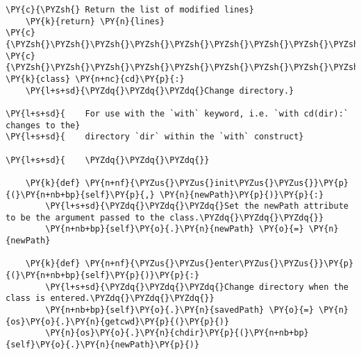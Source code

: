 \begin{Verbatim}[commandchars=\\\{\}]
    \PY{c}{\PYZsh{} Return the list of modified lines}
    \PY{k}{return} \PY{n}{lines}
\PY{c}{\PYZsh{}\PYZsh{}\PYZsh{}\PYZsh{}\PYZsh{}\PYZsh{}\PYZsh{}\PYZsh{}\PYZsh{}\PYZsh{}\PYZsh{}\PYZsh{}\PYZsh{}\PYZsh{}\PYZsh{}\PYZsh{}\PYZsh{}\PYZsh{}\PYZsh{}\PYZsh{}\PYZsh{}\PYZsh{}\PYZsh{}\PYZsh{}\PYZsh{}\PYZsh{}\PYZsh{}\PYZsh{}\PYZsh{}\PYZsh{}\PYZsh{}\PYZsh{}\PYZsh{}\PYZsh{}\PYZsh{}\PYZsh{}\PYZsh{}\PYZsh{}\PYZsh{}\PYZsh{}\PYZsh{}\PYZsh{}\PYZsh{}\PYZsh{}\PYZsh{}\PYZsh{}\PYZsh{}\PYZsh{}\PYZsh{}\PYZsh{}\PYZsh{}\PYZsh{}\PYZsh{}\PYZsh{}\PYZsh{}\PYZsh{}\PYZsh{}\PYZsh{}\PYZsh{}\PYZsh{}\PYZsh{}\PYZsh{}\PYZsh{}\PYZsh{}\PYZsh{}\PYZsh{}\PYZsh{}\PYZsh{}\PYZsh{}\PYZsh{}\PYZsh{}\PYZsh{}\PYZsh{}\PYZsh{}\PYZsh{}\PYZsh{}\PYZsh{}\PYZsh{}\PYZsh{}}
\PY{c}{\PYZsh{}\PYZsh{}\PYZsh{}\PYZsh{}\PYZsh{}\PYZsh{}\PYZsh{}\PYZsh{}\PYZsh{}\PYZsh{}\PYZsh{}\PYZsh{}\PYZsh{}\PYZsh{}\PYZsh{}\PYZsh{}\PYZsh{}\PYZsh{}\PYZsh{}\PYZsh{}\PYZsh{}\PYZsh{}\PYZsh{}\PYZsh{}\PYZsh{}\PYZsh{}\PYZsh{}\PYZsh{}\PYZsh{}\PYZsh{}\PYZsh{}\PYZsh{}\PYZsh{}\PYZsh{}\PYZsh{}\PYZsh{}\PYZsh{}\PYZsh{}\PYZsh{}\PYZsh{}\PYZsh{}\PYZsh{}\PYZsh{}\PYZsh{}\PYZsh{}\PYZsh{}\PYZsh{}\PYZsh{}\PYZsh{}\PYZsh{}\PYZsh{}\PYZsh{}\PYZsh{}\PYZsh{}\PYZsh{}\PYZsh{}\PYZsh{}\PYZsh{}\PYZsh{}\PYZsh{}\PYZsh{}\PYZsh{}\PYZsh{}\PYZsh{}\PYZsh{}\PYZsh{}\PYZsh{}\PYZsh{}\PYZsh{}\PYZsh{}\PYZsh{}\PYZsh{}\PYZsh{}\PYZsh{}\PYZsh{}\PYZsh{}\PYZsh{}\PYZsh{}\PYZsh{}}
\PY{k}{class} \PY{n+nc}{cd}\PY{p}{:}
    \PY{l+s+sd}{\PYZdq{}\PYZdq{}\PYZdq{}Change directory.}

\PY{l+s+sd}{    For use with the `with` keyword, i.e. `with cd(dir):` changes to the}
\PY{l+s+sd}{    directory `dir` within the `with` construct}

\PY{l+s+sd}{    \PYZdq{}\PYZdq{}\PYZdq{}}

    \PY{k}{def} \PY{n+nf}{\PYZus{}\PYZus{}init\PYZus{}\PYZus{}}\PY{p}{(}\PY{n+nb+bp}{self}\PY{p}{,} \PY{n}{newPath}\PY{p}{)}\PY{p}{:}
        \PY{l+s+sd}{\PYZdq{}\PYZdq{}\PYZdq{}Set the newPath attribute to be the argument passed to the class.\PYZdq{}\PYZdq{}\PYZdq{}}
        \PY{n+nb+bp}{self}\PY{o}{.}\PY{n}{newPath} \PY{o}{=} \PY{n}{newPath}

    \PY{k}{def} \PY{n+nf}{\PYZus{}\PYZus{}enter\PYZus{}\PYZus{}}\PY{p}{(}\PY{n+nb+bp}{self}\PY{p}{)}\PY{p}{:}
        \PY{l+s+sd}{\PYZdq{}\PYZdq{}\PYZdq{}Change directory when the class is entered.\PYZdq{}\PYZdq{}\PYZdq{}}
        \PY{n+nb+bp}{self}\PY{o}{.}\PY{n}{savedPath} \PY{o}{=} \PY{n}{os}\PY{o}{.}\PY{n}{getcwd}\PY{p}{(}\PY{p}{)}
        \PY{n}{os}\PY{o}{.}\PY{n}{chdir}\PY{p}{(}\PY{n+nb+bp}{self}\PY{o}{.}\PY{n}{newPath}\PY{p}{)}


\end{Verbatim}
